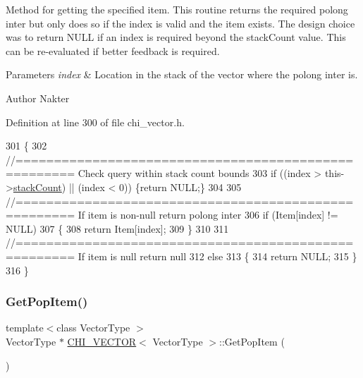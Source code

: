 Method for getting the specified item. This routine returns the required polong inter but only does so if the index is valid and the item exists. The design choice was to return N\+U\+LL if an index is required beyond the stack\+Count value. This can be re-\/evaluated if better feedback is required.


\begin{DoxyParams}{Parameters}
{\em index} & Location in the stack of the vector where the polong inter is.\\
\hline
\end{DoxyParams}
\begin{DoxyAuthor}{Author}
Nakter 
\end{DoxyAuthor}


Definition at line 300 of file chi\+\_\+vector.\+h.


\begin{DoxyCode}
301 \{
302     \textcolor{comment}{//===================================================== Check query within stack count bounds}
303     \textcolor{keywordflow}{if} ((index > this->\hyperlink{class_c_h_i___v_e_c_t_o_r_a91ef30712b0ead293dfe1adc29fee555}{stackCount}) || (index < 0)) \{\textcolor{keywordflow}{return} NULL;\}
304 
305     \textcolor{comment}{//===================================================== If item is non-null return polong inter}
306     \textcolor{keywordflow}{if} (Item[index] != NULL)
307     \{
308         \textcolor{keywordflow}{return} Item[index];
309     \}
310 
311     \textcolor{comment}{//===================================================== If item is null return null}
312     \textcolor{keywordflow}{else}
313     \{
314         \textcolor{keywordflow}{return} NULL;
315     \}
316 \}
\end{DoxyCode}
\mbox{\label{class_c_h_i___v_e_c_t_o_r_a01ae3966671bdacf558ef5ddd5ea8b6e_a01ae3966671bdacf558ef5ddd5ea8b6e}} 
\subsubsection{\texorpdfstring{Get\+Pop\+Item()}{GetPopItem()}}
{\footnotesize\ttfamily template$<$class Vector\+Type $>$ \\
Vector\+Type $\ast$ \hyperlink{class_c_h_i___v_e_c_t_o_r}{C\+H\+I\+\_\+\+V\+E\+C\+T\+OR}$<$ Vector\+Type $>$\+::Get\+Pop\+Item (\begin{DoxyParamCaption}{ }\end{DoxyParamCaption})}

